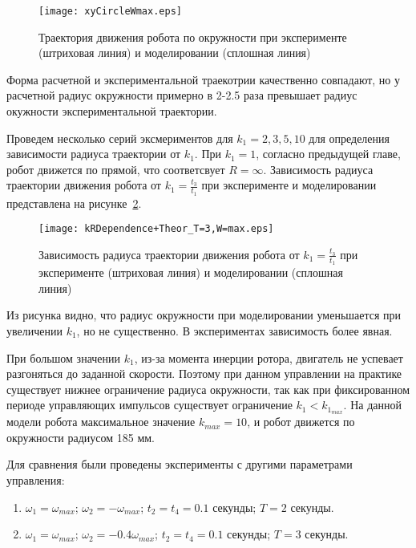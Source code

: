 \begin{figure}[!ht]
	\centering
	\texttt{[image: xyCircleWmax.eps]}
	\caption{Траектория движения робота по окружности при эксперименте (штриховая линия) и моделировании (сплошная линия)}
	\label{xyCircle1}
\end{figure}

Форма расчетной и экспериментальной траекотрии качественно совпадают, но у расчетной радиус окружности примерно в 2-2.5 раза превышает радиус окужности экспериментальной траектории.

Проведем несколько серий эксмериментов для $k_1 = 2, 3, 5, 10$ для определения зависимости радиуса траектории от $ k_1 $. При $k_1 = 1$, согласно предыдущей главе, робот движется по прямой, что соответсвует $ R = \infty $. Зависимость радиуса траектории движения робота от $k_1 = \frac{t_3}{t_1}$ при эксперименте и моделировании представлена на рисунке~\ref{kRDependence}.

\begin{figure}[!ht]
	\centering
	\texttt{[image: kRDependence+Theor\_T=3,W=max.eps]}
	\caption{Зависимость радиуса траектории движения робота от $k_1 = \frac{t_3}{t_1}$ при эксперименте (штриховая линия) и моделировании (сплошная линия)}
	\label{kRDependence}
\end{figure}

Из рисунка видно, что радиус окружности при моделировании уменьшается при увеличении $ k_1 $, но не существенно. В экспериментах зависимость более явная.

При большом значении $k_1$, из-за момента инерции ротора, двигатель не успевает разгоняться до заданной скорости. Поэтому при данном управлении на практике существует нижнее ограничение радиуса окружности, так как при фиксированном периоде управляющих импульсов существует ограничение $k_1 < k_{1_{max}}$. На данной модели робота максимальное значение $k_{max}=10$, и робот движется по окружности радиусом 185 мм.

Для сравнения были проведены эксперименты с другими параметрами управления:

\begin{enumerate}
	\itemsep=-2pt
	\item $\omega_1 = \omega_{max} $; $ \omega_2 = -\omega_{max} $; $ t_2=t_4=0.1 $ секунды; $ T = 2 $ секунды.
	\item $\omega_1 = \omega_{max} $; $ \omega_2 = -0.4\omega_{max} $; $ t_2=t_4=0.1 $ секунды; $ T = 3 $ секунды.
\end{enumerate}

